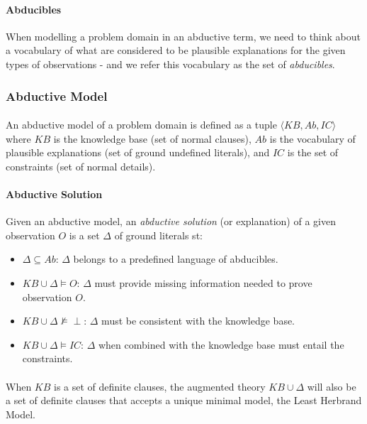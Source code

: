 \documentclass{article}
\theoremstyle{plain}
\theoremstyle{definition}
\begin{document}
\begin{multicols}{2}
\paragraph{Abducibles} When modelling a problem domain in an abductive term, we need to think about a vocabulary of what are considered to be plausible explanations for the given types of observations - and we refer this vocabulary as the set of \textit{abducibles}.

\subsubsection{Abductive Model}

\paragraph{} An abductive model of a problem domain is defined as a tuple $\langle KB, Ab, IC \rangle$ where $KB$ is the knowledge base (set of normal clauses), $Ab$ is the vocabulary of plausible explanations (set of ground undefined literals), and $IC$ is the set of constraints (set of normal details).

\paragraph{Abductive Solution} Given an abductive model, an \textit{abductive solution} (or explanation) of a given observation $O$ is a set $\Delta$ of ground literals st:

\begin{itemize}
\item $\Delta \subseteq Ab$: $\Delta$ belongs to a predefined language of abducibles.
\item $KB \cup \Delta \models O$: $\Delta$ must provide missing information needed to prove observation $O$.
\item $KB \cup \Delta \not\models \perp$: $\Delta$ must be consistent with the knowledge base.
\item $KB \cup \Delta \models IC$: $\Delta$ when combined with the knowledge base must entail the constraints.
\end{itemize}

\paragraph{} When $KB$ is a set of definite clauses, the augmented theory $KB \cup \Delta$ will also be a set of definite clauses that accepts a unique minimal model, the Least Herbrand Model.


\end{multicols}
\end{document}
